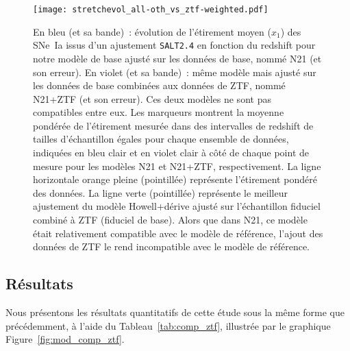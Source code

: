 \documentclass[../main/main.tex]{subfiles}
\begin{document}
\begin{figure}[ht]
    \centering
    \texttt{[image: stretchevol\_all-oth\_vs\_ztf-weighted.pdf]}
    \caption[Évolution de l'étirement moyen des SNe~Ia en fonction du redshift
    issu de la prédiction de notre modèle de base selon l'échantillon
    utilisé]{\footnotesize En bleu (et sa bande)~: évolution de l'étirement
        moyen ($x_1$) des SNe~Ia issus d'un ajustement \texttt{SALT2.4} en
        fonction du redshift pour notre modèle de base ajusté sur les données de
        base, nommé N21 (et son erreur). En violet (et sa bande)~: même modèle
        mais ajusté sur les données de base combinées aux données de ZTF, nommé
        N21+ZTF (et son erreur). Ces deux modèles ne sont pas compatibles entre
        eux. Les marqueurs montrent la moyenne pondérée de l'étirement mesurée
        dans des intervalles de redshift de tailles d'échantillon égales pour
        chaque ensemble de données, indiquées en bleu clair et en violet clair à
        côté de chaque point de mesure pour les modèles N21 et N21+ZTF,
        respectivement. La ligne horizontale orange pleine (pointillée)
        représente l'étirement pondéré des données. La ligne verte (pointillée)
        représente le meilleur ajustement du modèle Howell+dérive ajusté sur
        l'échantillon fiduciel combiné à ZTF (fiduciel de base). Alors que dans
        N21, ce modèle était relativement compatible avec le modèle de
        référence, l'ajout des données de ZTF le rend incompatible avec le
    modèle de référence.}
    \label{fig:evol_all_ztf}
\end{figure}

\subsection{Résultats}\label{ssec:zres}

Nous présentons les résultats quantitatifs de cette étude sous la même forme que
précédemment, à l'aide du Tableau~\ref{tab:comp_ztf}, illustrée par le graphique
Figure~\ref{fig:mod_comp_ztf}.
\end{document}
